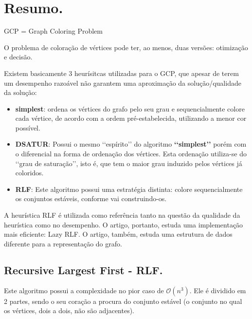 \documentclass[a4paper,12pt]{article}
\begin{document}
\section{Resumo.}

GCP = Graph Coloring Problem

O problema de coloração de vértices pode ter, ao menos, duas versões: otimização e decisão.

Existem basicamente 3 heurísitcas utilizadas para o GCP, que apesar de terem um desempenho razoável não garantem uma aproximação da solução/qualidade da solução:

\begin{itemize}
\item \textbf{simplest}: ordena os vértices do grafo pelo seu grau e sequencialmente colore cada vértice, de acordo com a ordem pré-estabelecida, utilizando a menor cor possível.
\item \textbf{DSATUR}: Possui o mesmo \lq\lq{}espírito\rq\rq{} do algoritmo \textbf{\lq\lq{}simplest\rq\rq{}} porém com o diferencial na forma de ordenação dos vértices. Esta ordenação utiliza-se do \lq\lq{}grau de saturação\rq\rq{}, isto é, que tem o maior grau induzido pelos vértices já coloridos. %
\item \textbf{RLF}: Este algoritmo possui uma estratégia distinta: colore sequencialmente os conjuntos estáveis, conforme vai construindo-os.
\end{itemize}


A heurística RLF é utilizada como referência tanto na questão da qualidade da heurística como no desempenho. O artigo, portanto, estuda uma implementação mais eficiente: Lazy RLF. O artigo, também, estuda uma estrutura de dados diferente para a representação do grafo.

\subsection{Recursive Largest First - RLF.}

Este algoritmo possui a complexidade no pior caso de $\mathcal{O}(n^3)$. Ele é dividido em 2 partes, sendo o seu coração a procura do conjunto estável (o conjunto no qual os vértices, dois a dois, não são adjacentes).
\end{document}
